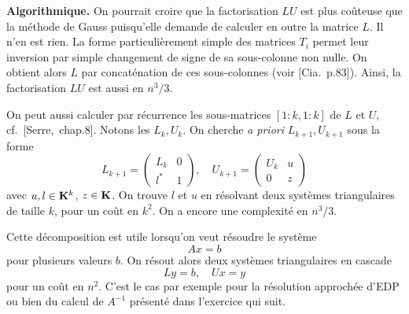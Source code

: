 {\bf Algorithmique.} On pourrait croire que la factorisation $LU$ est plus
coûteuse que la méthode de Gauss puisqu'elle demande de calculer en outre la
matrice $L$. Il n'en est rien. La forme particulièrement simple des matrices
$T_i$ permet leur inversion par simple changement de signe de sa sous-colonne
non nulle. On obtient alors $L$ par concaténation de ces sous-colonnes (voir
[Cia.~p.83]).
Ainsi, la factorisation $LU$ est aussi en $n^3/3$.

On peut aussi calculer par récurrence les sous-matrices $[1:k,1:k]$ de $L$ et
$U$, cf.~[Serre,~chap.8]. Notons les $L_k,U_k$.
On cherche \emph{a priori} $L_{k+1},U_{k+1}$ sous la forme
\[
L_{k+1} = \left(\begin{array}{cc}
L_k & 0 \\
l^* & 1
\end{array}\right), \quad U_{k+1} = \left(\begin{array}{cc}
U_k & u \\
0 & z
\end{array}\right)
\]
avec $u,l \in \mathbf{K}^k$, $z \in \mathbf{K}$. On trouve $l$ et $u$ en résolvant deux
systèmes triangulaires de taille $k$, pour un coût en $k^2$. On a encore une
complexité en $n^3/3$.

\begin{remark}
Cette décomposition est utile lorsqu'on veut résoudre le système
\[
Ax = b
\]
pour plusieurs valeurs $b$. On résout alors deux systèmes triangulaires en cascade
\[
Ly = b, \quad Ux = y
\]
pour un coût en $n^2$. C'est le cas par exemple pour la résolution approchée
d'EDP %
ou bien du calcul de $A^{-1}$ présenté dans l'exercice qui suit.
\end{remark}

